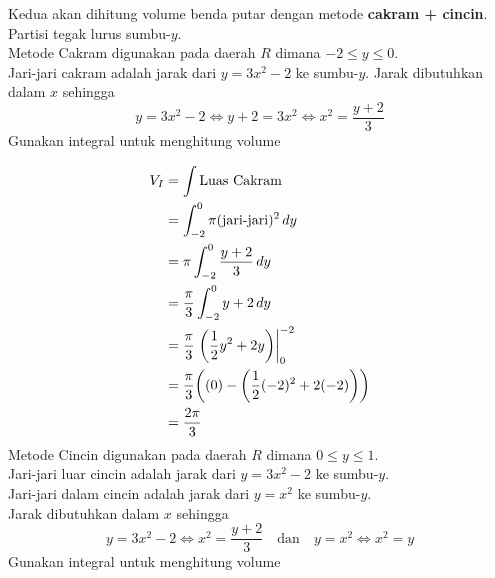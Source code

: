 \begin{enumerate}[leftmargin=*, label={\arabic*}.]
\begin{enumerate}[label={\alph*}.]
    Kedua akan dihitung volume benda putar dengan metode \textbf{cakram + cincin}.\\ 
    Partisi tegak lurus sumbu-$y$.\\
    Metode Cakram digunakan pada daerah $R$ dimana $-2 \leq y \leq 0$.\\
    Jari-jari cakram adalah jarak dari $y=3x^{2}-2$ ke sumbu-$y$.
    Jarak dibutuhkan dalam $x$ sehingga
    \[
    y=3x^{2}-2 \iff y+2 = 3x^{2} \iff x^{2}=\frac{y+2}{3}
    \]
    Gunakan integral untuk menghitung volume

    \begin{align*}
        V_I &= \int \text{Luas Cakram}\\
        &=\int_{-2}^{0} \pi(\text{jari-jari})^2\,dy\\
        &=\pi\int_{-2}^{0} \frac{y+2}{3}\,dy\\
        &=\frac{\pi}{3}\int_{-2}^{0} y+2\,dy\\
        &=\frac{\pi}{3}\eval{\frac{1}{2}y^{2}+2y}{0}{-2}\\
        &=\frac{\pi}{3}\brk*{(0)-\brk*{\frac{1}{2}(-2)^{2}+2(-2)}}\\
        &=\frac{2\pi}{3}
    \end{align*}
    Metode Cincin digunakan pada daerah $R$ dimana $0 \leq y \leq 1$.\\
    Jari-jari luar cincin adalah jarak dari $y=3x^{2}-2$ ke sumbu-$y$.\\
    Jari-jari dalam cincin adalah jarak dari $y=x^{2}$ ke sumbu-$y$.\\
    Jarak dibutuhkan dalam $x$ sehingga
    \[
        y=3x^{2}-2 \iff x^{2}=\frac{y+2}{3}\quad \text{dan} \quad y=x^{2} \iff x^{2}=y
    \]
    Gunakan integral untuk menghitung volume


\end{enumerate}
\end{enumerate}
